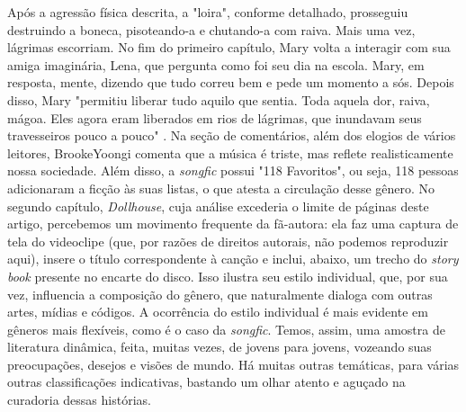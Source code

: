 Após a agressão física descrita, a "loira", conforme detalhado,
prosseguiu destruindo a boneca, pisoteando-a e chutando-a com raiva.
Mais uma vez, lágrimas escorriam. No fim do primeiro capítulo, 
Mary
\cite{crybaby2015} volta a interagir com sua amiga imaginária, Lena, que pergunta
como foi seu dia na escola. Mary, em resposta, mente, dizendo que tudo
correu bem e pede um momento a sós. Depois disso, Mary "permitiu liberar
tudo aquilo que sentia. Toda aquela dor, raiva, mágoa. Eles agora eram
liberados em rios de lágrimas, que inundavam seus travesseiros pouco a
pouco" \cite{brookeyoongi}. Na seção de comentários, além dos
elogios de vários leitores, BrookeYoongi comenta que a música é triste,
mas reflete realisticamente nossa sociedade. Além disso, a
\emph{songfic} possui "118 Favoritos", ou seja, 118 pessoas adicionaram
a ficção às suas listas, o que atesta a circulação desse gênero. No
segundo capítulo, \emph{Dollhouse}, cuja análise excederia o limite de
páginas deste artigo, percebemos um movimento frequente da fã-autora:
ela faz uma captura de tela do videoclipe (que, por razões de direitos
autorais, não podemos reproduzir aqui), insere o título correspondente à
canção e inclui, abaixo, um trecho do \emph{story book} presente no
encarte do disco. Isso ilustra seu estilo individual, que, por sua vez,
influencia a composição do gênero, que naturalmente dialoga com outras
artes, mídias e códigos. A ocorrência do estilo individual é mais
evidente em gêneros mais flexíveis, como é o caso da \emph{songfic}.
Temos, assim, uma amostra de literatura dinâmica, feita, muitas vezes,
de jovens para jovens, vozeando suas preocupações, desejos e visões de
mundo. Há muitas outras temáticas, para várias outras classificações
indicativas, bastando um olhar atento e aguçado na curadoria dessas
histórias.
